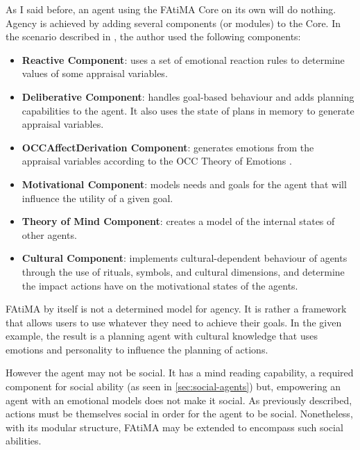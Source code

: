 As I said before, an agent using the \ac{FAtiMA} Core on its own will do nothing.
Agency is achieved by adding several components (or modules) to the Core.
In the scenario described in \cite{mascarenhas:cultural-behaviour}, the author used the following components:

\begin{itemize}
\item \textbf{Reactive Component}: uses a set of emotional reaction rules to determine values of some appraisal variables.
\item \textbf{Deliberative Component}: handles goal-based behaviour and adds planning capabilities to the agent. It also uses the state of plans in memory to generate appraisal variables.
\item \textbf{OCCAffectDerivation Component}: generates emotions from the appraisal variables according to the OCC Theory of Emotions \cite{ortony:occ}.
\item \textbf{Motivational Component}: models needs and goals for the agent that will influence the utility of a given goal.
\item \textbf{Theory of Mind Component}: creates a model of the internal states of other agents.
\item \textbf{Cultural Component}: implements cultural-dependent behaviour of agents through the use of rituals, symbols, and cultural dimensions, and determine the impact actions have on the motivational states of the agents.
\end{itemize}

\ac{FAtiMA} by itself is not a determined model for agency.
It is rather a framework that allows users to use whatever they need to achieve their goals.
In the given example, the result is a planning agent with cultural knowledge that uses emotions and personality to influence the planning of actions.

However the agent may not be social.
It has a mind reading capability, a required component for social ability (as seen in \ref{sec:social-agents}) but, empowering an agent with an emotional models does not make it social.
As previously described, actions must be themselves social in order for the agent to be social. 
Nonetheless, with its modular structure, \ac{FAtiMA} may be extended to encompass such social abilities.